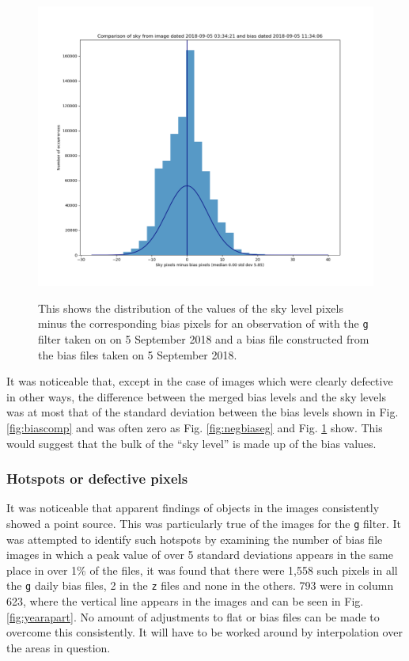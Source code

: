 \begin{figure}[!htbp]
\begin{center}
\includegraphics[scale=0.5]{images/negbiasmerg.png}
\end{center}   
\caption{This shows the distribution of the values of the sky level pixels minus
the corresponding bias pixels for an observation of {\bstar} with the \texttt{g}
filter taken on on 5 September 2018 and a bias file constructed from the bias
files taken on 5 September 2018.} \protect\label{fig:negbiasmerg}
\end{figure}

It was noticeable that, except in the case of images which were clearly
defective in other ways, the difference between the merged bias levels and the
sky levels was at most that of the standard deviation between the bias levels
shown in Fig. \ref{fig:biascomp} and was often zero as Fig.
\ref{fig:negbiaseg} and Fig. \ref{fig:negbiasmerg} show. This would suggest that
the bulk of the ``sky level'' is made up of the bias values.

\subsubsection{Hotspots or defective pixels}
\protect\label{section:hotspots}

It was noticeable that apparent findings of objects in the images consistently
showed a point source. This was particularly true of the images for the
\texttt{g} filter. It was attempted to identify such hotspots by examining the
number of bias file images in which a peak value of over 5 standard deviations appears in the same place in over 1\% of the files,
it was found that there were 1,558 such pixels in all the
\texttt{g} daily bias files, 2 in the \texttt{z} files and none in the others.
793 were in column 623, where the vertical line appears in the images and can be
seen in Fig. \ref{fig:yearapart}. No amount of adjustments to flat or bias files
can be made to overcome this consistently. It will have to be worked around by
interpolation over the areas in question.

